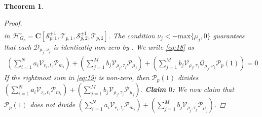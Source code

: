 \documentclass{amsart}%
\theoremstyle{plain}
\newtheorem{thm}{Theorem}[subsection]
\theoremstyle{plain}
\theoremstyle{remark}
\begin{document}
\begin{thm}
\begin{proof}
\begin{align}
        \end{align}
        in $\mathcal{H}_{G_p}^\circ=\mathbf{C}[\mathcal{S}_{p,1}^{\pm 1},\mathcal{T}_{p,1},\mathcal{S}_{p,2}^{\pm 1},\mathcal{T}_{p,2}]$. The condition $\nu_j<-\mathrm{max}\{\mu_j,0\}$ guarantees that each $\mathscr{D}_{\mu_j,\nu_j}$ is identically non-zero by . 
        We write  \eqref{eq:18} as 
        \begin{align}\label{eq:19}
            \left(\sum_{i=1}^N a_i\mathscr{V}_{r_i,t_i}\mathscr{P}_{m_i}\right)+\left(\sum_{j=1}^M b_j \mathcal{V}_{\rho_j,\tau_j}\mathscr{P}_{\mu_j}\right)+\left(\sum_{j=1}^Mb_j \mathscr{V}_{\rho_j,\tau_j}\mathscr{Q}_{\mu_j,\nu_j}\mathcal{P}_p(1)\right)=0
        \end{align}
        If the rightmost sum in \eqref{eq:19} is non-zero, then $\mathcal{P}_p(1)$ divides $\left(\sum_{i=1}^N a_i\mathscr{V}_{r_i,t_i}\mathscr{P}_{m_i}\right)+\left(\sum_{j=1}^M b_j \mathscr{V}_{\rho_j,\tau_j}\mathscr{P}_{\mu_j}\right)$.
        \textbf{Claim $0$:} We now claim that $\mathcal{P}_p(1)$ does not divide $\left(\sum_{i=1}^N a_i\mathscr{V}_{r_i,t_i}\mathscr{P}_{m_i}\right)+\left(\sum_{j=1}^M b_j \mathscr{V}_{\rho_j,\tau_j}\mathscr{P}_{\mu_j}\right)$.
        

\end{proof}
\end{thm}
\end{document}
